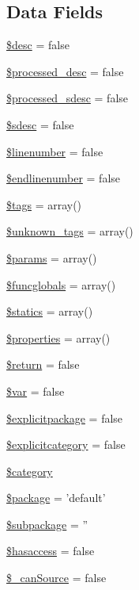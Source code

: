 \subsection*{\-Data \-Fields}
\begin{DoxyCompactItemize}
\item 
\hyperlink{classparser_doc_block_a31059b9e4d0c5af34df20da32232ea9a}{\$desc} = false
\item 
\hyperlink{classparser_doc_block_ad6a3ff14bcbf8707f2c8b1838aa68531}{\$processed\-\_\-desc} = false
\item 
\hyperlink{classparser_doc_block_aacdabb7deea30aa8da786f3fd24c2f13}{\$processed\-\_\-sdesc} = false
\item 
\hyperlink{classparser_doc_block_a74ada69e01ee1dee83a339720be17b5c}{\$sdesc} = false
\item 
\hyperlink{classparser_doc_block_ab6068db00e5a532a6c7211da1897185b}{\$linenumber} = false
\item 
\hyperlink{classparser_doc_block_a4d96f7721accddf9974537185fe43f0e}{\$endlinenumber} = false
\item 
\hyperlink{classparser_doc_block_a475a6a63b85186663d34151bcbd21590}{\$tags} = array()
\item 
\hyperlink{classparser_doc_block_ae191ccaa06561b85353dce1c216fc48c}{\$unknown\-\_\-tags} = array()
\item 
\hyperlink{classparser_doc_block_afe68e6fbe7acfbffc0af0c84a1996466}{\$params} = array()
\item 
\hyperlink{classparser_doc_block_ae2547859cc606098a4bf54f7fbfbf9f4}{\$funcglobals} = array()
\item 
\hyperlink{classparser_doc_block_a6f9b86cb70b333ced9db7133842c4880}{\$statics} = array()
\item 
\hyperlink{classparser_doc_block_a7f675de4b5983d7e84f6573b7d4d453d}{\$properties} = array()
\item 
\hyperlink{classparser_doc_block_a9e8633cf48f7c5fc8cc9f5fa31450b99}{\$return} = false
\item 
\hyperlink{classparser_doc_block_a9184c9cf1f1e58b87296500a3c3a9291}{\$var} = false
\item 
\hyperlink{classparser_doc_block_a807142a46449e6b19f60f956580bbb23}{\$explicitpackage} = false
\item 
\hyperlink{classparser_doc_block_ae9ebdac226fc1207ab28d68db8ecc5cc}{\$explicitcategory} = false
\item 
\hyperlink{classparser_doc_block_a18b2a8d133fa7733bf34abcc6ca2ef5b}{\$category}
\item 
\hyperlink{classparser_doc_block_a365395516cc195292e97e09bc0d165ae}{\$package} = 'default'
\item 
\hyperlink{classparser_doc_block_ac601dc8dc2a086b6381128cc9c7a3fc5}{\$subpackage} = ''
\item 
\hyperlink{classparser_doc_block_aad31327fa662a2b714b5926472228c8b}{\$hasaccess} = false
\item 
\hyperlink{classparser_doc_block_a8a4bb425608443c8ddddc1a58140e83a}{\$\-\_\-can\-Source} = false
\end{DoxyCompactItemize}
